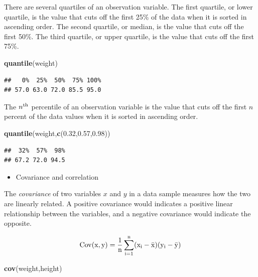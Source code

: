 \documentclass[]{article}
\def\tightlist{}
\newenvironment{Shaded}{\begin{snugshade}}{\end{snugshade}}
\newcommand{\KeywordTok}[1]{\textcolor[rgb]{0.13,0.29,0.53}{\textbf{{#1}}}}
\newcommand{\FloatTok}[1]{\textcolor[rgb]{0.00,0.00,0.81}{{#1}}}
\newcommand{\NormalTok}[1]{{#1}}
\numberwithin{equation}{section}
\begin{document}
There are several quartiles of an observation variable. The first
quartile, or lower quartile, is the value that cuts off the first 25\%
of the data when it is sorted in ascending order. The second quartile,
or median, is the value that cuts off the first 50\%. The third
quartile, or upper quartile, is the value that cuts off the first 75\%.

\begin{Shaded}
\begin{Highlighting}[]
\KeywordTok{quantile}\NormalTok{(weight)}
\end{Highlighting}
\end{Shaded}

\begin{verbatim}
##   0%  25%  50%  75% 100% 
## 57.0 63.0 72.0 85.5 95.0
\end{verbatim}

The \(n^{\rm th}\) percentile of an observation variable is the value
that cuts off the first \(n\) percent of the data values when it is
sorted in ascending order.

\begin{Shaded}
\begin{Highlighting}[]
\KeywordTok{quantile}\NormalTok{(weight,}\KeywordTok{c}\NormalTok{(}\FloatTok{0.32}\NormalTok{,}\FloatTok{0.57}\NormalTok{,}\FloatTok{0.98}\NormalTok{))}
\end{Highlighting}
\end{Shaded}

\begin{verbatim}
##  32%  57%  98% 
## 67.2 72.0 94.5
\end{verbatim}

\begin{itemize}
\tightlist
\item
  Covariance and correlation
\end{itemize}

The \emph{covariance} of two variables \(x\) and \(y\) in a data sample
measures how the two are linearly related. A positive covariance would
indicates a positive linear relationship between the variables, and a
negative covariance would indicate the opposite.

\[
\rm{Cov}(x,y) = \frac{1}{n}\sum_{i=1}^{n}(x_i - \bar{x})(y_i - \bar{y})
\]

\begin{Shaded}
\begin{Highlighting}[]
\KeywordTok{cov}\NormalTok{(weight,height)}
\end{Highlighting}
\end{Shaded}
\end{document}

